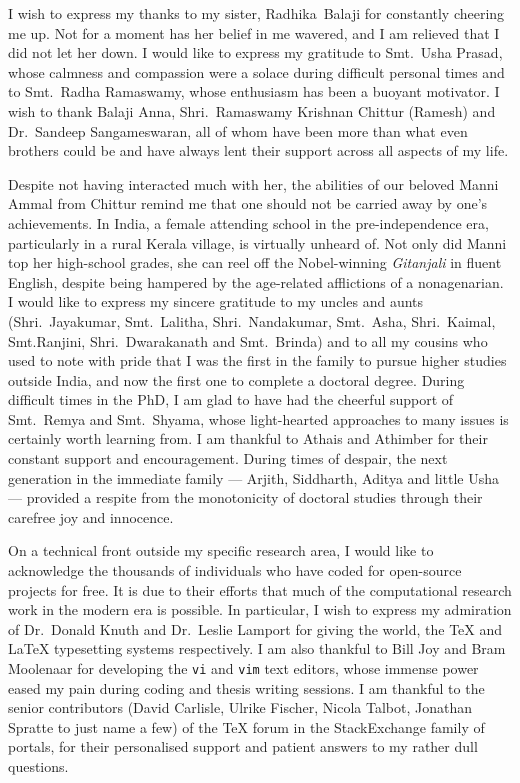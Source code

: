 I wish to express my thanks to my sister, \mbox{Radhika Balaji} for constantly
cheering me up. Not for a moment has her belief in me wavered, and I am relieved
that I did not let her down. I would like to express my gratitude to Smt.~Usha
Prasad, whose calmness and compassion were a solace during difficult personal
times and to Smt.~Radha Ramaswamy, whose enthusiasm has been a  buoyant
motivator. I wish to thank Balaji Anna, Shri.~Ramaswamy Krishnan Chittur
(Ramesh) and Dr.~Sandeep Sangameswaran, all of whom have been more than what
even brothers could be and have always lent their support across all aspects of
my life.



Despite not having interacted much with her, the abilities of our beloved Manni
Ammal from Chittur remind me that one should not be carried away by one's
achievements. In India, a female attending school in the pre-independence era,
particularly in a rural Kerala village, is virtually unheard of. Not only did
Manni top her high-school grades, she can reel off the Nobel-winning
\emph{Gitanjali} in fluent English, despite being hampered by the age-related
afflictions of a nonagenarian. I would like to express my sincere gratitude to
my uncles and aunts (Shri.~Jayakumar, Smt.~Lalitha, Shri.~Nandakumar, Smt.~Asha,
Shri.~Kaimal, Smt.Ranjini, Shri.~Dwarakanath and Smt.~Brinda) and to all my
cousins who used to note with pride that I was the first in the family to
pursue higher studies outside India, and now the first one to complete a
doctoral degree. During  difficult times in the PhD, I am glad to have had the
cheerful support of Smt.~Remya and Smt.~Shyama, whose light-hearted approaches
to many issues is certainly worth learning from. I am thankful to Athais and
Athimber for their constant support and encouragement. During times of despair,
the next generation in the immediate family --- Arjith, Siddharth, Aditya and
little Usha --- provided a respite from the monotonicity of doctoral studies
through their carefree joy and innocence.


On a technical front outside my specific research area, I would like to
acknowledge the thousands of individuals who have coded for open-source projects
for free. It is due to their efforts that much of the computational research
work in the modern era is possible. In particular, I wish to express my
admiration of Dr.~Donald Knuth and Dr.~Leslie Lamport for giving the world, the
\TeX{} and \LaTeX{} typesetting systems respectively. I am also thankful to Bill
Joy and Bram Moolenaar for developing the \texttt{vi} and \texttt{vim} text
editors, whose immense power eased my pain during coding and thesis writing
sessions. I am thankful to the senior contributors (David Carlisle, Ulrike
Fischer, Nicola Talbot, Jonathan Spratte to just name a few) of the TeX forum in
the StackExchange family of portals, for their personalised support and patient
answers to my rather dull questions.

